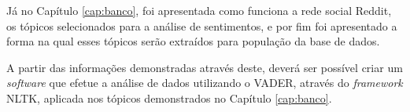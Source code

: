 Já no Capítulo \ref{cap:banco}, foi apresentada como funciona a rede social
Reddit, os tópicos selecionados para a análise de sentimentos, e por fim foi
apresentado a forma na qual esses tópicos serão extraídos para população da base
de dados.

A partir das informações demonstradas através deste, deverá ser possível criar
um \textit{software} que efetue a análise de dados utilizando o \ac{VADER},
através do \textit{framework} \ac{NLTK}, aplicada nos tópicos demonstrados no
Capítulo \ref{cap:banco}.


